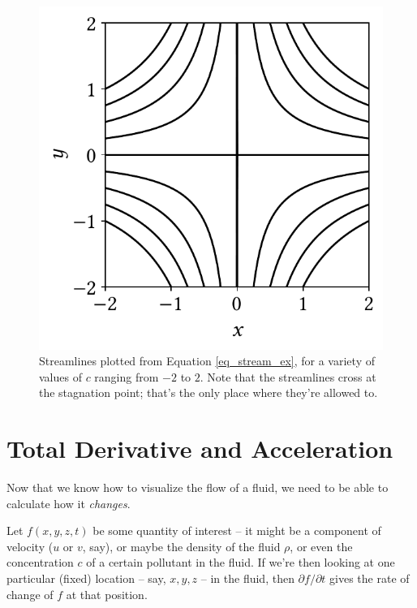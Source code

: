 \begin{figure}[t]
\centering\includegraphics[width=0.5\linewidth]{Figures/Chapter1/fig_streamline_example}
\caption{Streamlines plotted from Equation \ref{eq_stream_ex}, for a variety of values of $c$ ranging from $-2$ to $2$.  Note that the streamlines cross at the stagnation point; that's the only place where they're allowed to.}
\label{fig_streamline_example}
\end{figure}

%
%
%

\section{Total Derivative and Acceleration}
\label{sec_tot_deriv}

Now that we know how to visualize the flow of a fluid, we need to be able to calculate how it \emph{changes}.  

Let $f(x, y, z, t)$ be some quantity of interest -- it might be a component of velocity ($u$ or $v$, say), or maybe the density of the fluid $\rho$, or even the concentration $c$ of a certain pollutant in the fluid.  If we're then looking at one particular (fixed) location -- say, $x, y, z$ -- in the fluid, then $\partial f / \partial t$ gives the rate of change of $f$ at that position.

